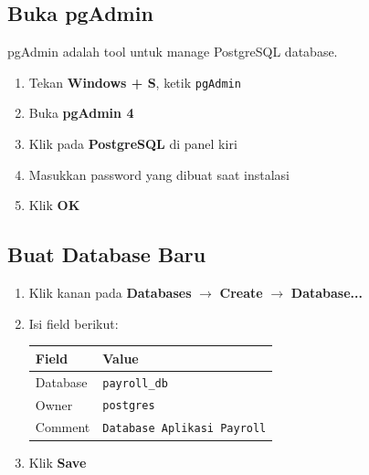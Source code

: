 \documentclass[12pt,a4paper]{article}
\begin{document}
\subsection{Buka pgAdmin}
pgAdmin adalah tool untuk manage PostgreSQL database.

\begin{enumerate}
    \item Tekan \textbf{Windows + S}, ketik \texttt{pgAdmin}
    \item Buka \textbf{pgAdmin 4}
    \item Klik pada \textbf{PostgreSQL} di panel kiri
    \item Masukkan password yang dibuat saat instalasi
    \item Klik \textbf{OK}
\end{enumerate}

\subsection{Buat Database Baru}

\begin{enumerate}
    \item Klik kanan pada \textbf{Databases} $\rightarrow$ \textbf{Create} $\rightarrow$ \textbf{Database...}
    \item Isi field berikut:
    \begin{center}
    \begin{tabular}{|l|l|}
        \hline
        \textbf{Field} & \textbf{Value} \\
        \hline
        Database & \texttt{payroll\_db} \\
        \hline
        Owner & \texttt{postgres} \\
        \hline
        Comment & \texttt{Database Aplikasi Payroll} \\
        \hline
    \end{tabular}
    \end{center}
    \item Klik \textbf{Save}
\end{enumerate}

\begin{center}
\end{center}
\end{document}
